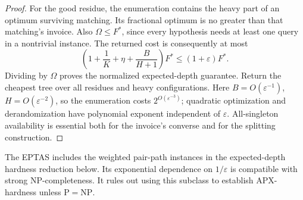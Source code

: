 \begin{proof}
For the good residue, the enumeration contains the heavy part of
an optimum surviving matching. Its fractional optimum is no greater
than that matching's invoice. Also $\Omega\le F^*$, since every
hypothesis needs at least one query in a nontrivial instance. The
returned cost is consequently at most
\[
 \left(1+\frac1K+\eta+\frac B{H+1}\right)F^*
 \le(1+\varepsilon)F^*.
\]
Dividing by $\Omega$ proves the normalized expected-depth guarantee.
Return the cheapest tree over all residues and heavy configurations.
Here $B=O(\varepsilon^{-1})$, $H=O(\varepsilon^{-2})$, so the
enumeration costs $2^{O(\varepsilon^{-3})}$; quadratic optimization
and derandomization have polynomial exponent independent of
$\varepsilon$. All-singleton availability is essential both for the
invoice's converse and for the splitting construction.
\end{proof}

The EPTAS includes the weighted pair-path instances in the
expected-depth hardness reduction below. Its exponential dependence
on $1/\varepsilon$ is compatible with strong NP-completeness.
It rules out using this subclass to
establish APX-hardness unless $\mathrm P=\mathrm{NP}$.
